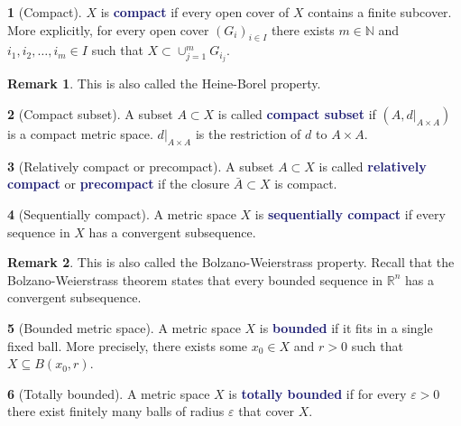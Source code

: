 \documentclass[12pt]{article}
\numberwithin{equation}{section}
\newcommand{\navy}[1]{\textcolor{MidnightBlue}{\bf #1}}
\theoremstyle{plain}
\theoremstyle{definition}
\newtheorem{definition}{\color{MidnightBlue}{\textbf{Definition}}}[section]
\newtheorem*{remark}{Remark}
\def\ss{\subset}
\newcommand{\1}{\mathbbm 1}
\newcommand{\e}{\varepsilon}
\newcommand{\RR}{\mathbb R}
\newcommand{\NN}{\mathbb N}
\begin{document}
\begin{definition}[Compact]
$X$ is \navy{compact} if every open cover of $X$ contains a finite subcover. More explicitly, for every open cover $(G_i)_{i \in I}$ there exists $m \in \NN$ and $i_1, i_2, \ldots, i_m \in I$ such that $X \subset \cup_{j=1}^m G_{i_j}$.
\begin{remark}
This is also called the Heine-Borel property.
\end{remark}
\end{definition}

\begin{definition}[Compact subset]
A subset $A \subset X$ is called \navy{compact subset} if $(A,d\vert_{A\times A})$ is a compact metric space. $d\vert_{A\times A}$ is the restriction of $d$ to $A \times A$.
\end{definition}

\begin{definition}[Relatively compact or precompact]
A subset $A \ss X$ is called \navy{relatively compact} or \navy{precompact} if the closure $\bar{A} \ss X$ is compact.
\end{definition}

\begin{definition}[Sequentially compact]
A metric space $X$ is \navy{sequentially compact} if every sequence in $X$ has a convergent subsequence.
\begin{remark}
This is also called the Bolzano-Weierstrass property. Recall that the Bolzano-Weierstrass theorem states that every bounded sequence in $\RR^n$ has a convergent subsequence.
\end{remark}
\end{definition}

\begin{definition}[Bounded metric space]
A metric space $X$ is \navy{bounded} if it fits in a single fixed ball. More precisely, there exists some $x_0 \in X$ and $r > 0$ such that $X \subseteq B(x_0,r)$.
\end{definition}

\begin{definition}[Totally bounded]
A metric space $X$ is \navy{totally bounded} if for every $\e > 0$ there exist finitely many balls of radius $\e$ that cover $X$.
\end{definition}
\end{document}
